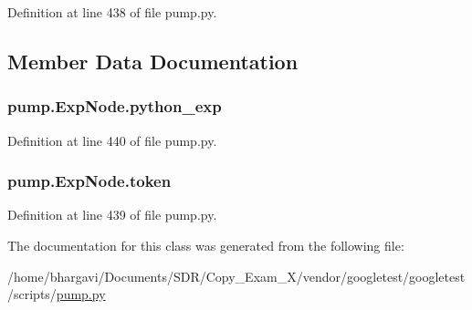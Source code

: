 Definition at line 438 of file pump.\+py.



\subsection{Member Data Documentation}
\subsubsection[{\texorpdfstring{python\+\_\+exp}{python_exp}}]{\setlength{\rightskip}{0pt plus 5cm}pump.\+Exp\+Node.\+python\+\_\+exp}\hypertarget{classpump_1_1_exp_node_adccfe4778c2e34f6b2c88118c0f1587f}{}\label{classpump_1_1_exp_node_adccfe4778c2e34f6b2c88118c0f1587f}


Definition at line 440 of file pump.\+py.

\subsubsection[{\texorpdfstring{token}{token}}]{\setlength{\rightskip}{0pt plus 5cm}pump.\+Exp\+Node.\+token}\hypertarget{classpump_1_1_exp_node_ade05a5a32535d717dc5c194569aaf356}{}\label{classpump_1_1_exp_node_ade05a5a32535d717dc5c194569aaf356}


Definition at line 439 of file pump.\+py.



The documentation for this class was generated from the following file\+:\begin{DoxyCompactItemize}
\item 
/home/bhargavi/\+Documents/\+S\+D\+R/\+Copy\+\_\+\+Exam\+\_\+X/vendor/googletest/googletest/scripts/\hyperlink{pump_8py}{pump.\+py}\end{DoxyCompactItemize}
